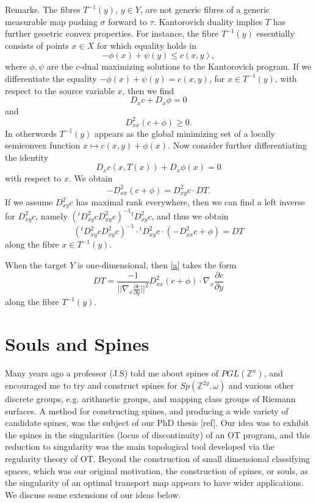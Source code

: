 \documentclass[12pt]{amsart}
\theoremstyle{definition}
\theoremstyle{remark}
\newcommand{\bZ}{\mathbb{Z}}
\begin{document}
Remarks. The fibres $T^{-1}(y)$, $y\in Y$, are not generic fibres of a generic measurable map pushing $\sigma$ forward to $\tau$. Kantorovich duality implies $T$ has further geoetric convex properties. For instance, the fibre $T^{-1}(y)$ essentially consists of points $x\in X$ for which equality holds in $$-\phi(x)+\psi(y) \leq c(x,y), $$ where $\phi, \psi$ are the $c$-dual maximizing solutions to the Kantorovich program. If we differentiate the equality $-\phi(x)+\psi(y)=c(x,y)$, for $x\in T^{-1}(y)$, with respect to the source variable $x$, then we find $$D_x c + D_x \phi=0$$ and $$D^2_{xx}(c+\phi) \geq 0.$$ In otherwords $T^{-1}(y)$ appears as the global minimizing set of a locally semiconvex function $x\mapsto c(x,y) +\phi(x)$.  Now consider further differentiating the identity $$D_x c(x, T(x)) + D_x \phi(x)=0$$ with respect to $x$. We obtain $$-D^2_{xx} (c+\phi)=D^2_{xy} c \cdot DT.$$ If we assume $D^2_{xy}c$ has maximal rank everywhere, then we can find a left inverse for $D^2_{xy}c$, namely $({}^t D^2_{xy} c D^2_{xy} c)^{-1} {}^t D^2_{xy} c$, and thus we obtain 
\begin{equation}\label{a} ({}^t D^2_{xy} c D^2_{xy} c)^{-1} \cdot {}^t D^2_{xy} c \cdot (-D^2_{xx} c +\phi) =DT
\end{equation} along the fibre $x\in T^{-1}(y)$. 
 
When the target $Y$ is one-dimensional, then \eqref{a} takes the form 
\begin{equation}\label{a1}
DT=\frac{-1}{||\nabla_x \frac{\partial c}{\partial y}||^2} D^2_{xx}(c+\phi) \cdot \nabla_x \frac{\partial c}{\partial y}   
\end{equation} along the fibre $T^{-1}(y)$. 










\section{Souls and Spines}
Many years ago a professor (J.S) told me about spines of $PGL(\mathbb{Z}^n)$, and encouraged me to try and construct spines for $Sp(\bZ^{2g}, \omega)$ and various other discrete groups, e.g. arithmetic groups, and mapping class groups of Riemann surfaces. A method for constructing spines, and producing a wide variety of candidate spines, was the subject of our PhD thesis [ref]. Our idea was to exhibit the spines in the singularities (locus of discontinuity) of an OT program, and this reduction to singularity was the main topological tool developed via the regularity theory of OT. Beyond the construction of small dimensional classifying spaces, which was our original motivation, the construction of spines, or souls, as the singularity of an optimal transport map appears to have wider applications. We discuss some extensions of our ideas below.
\end{document}
